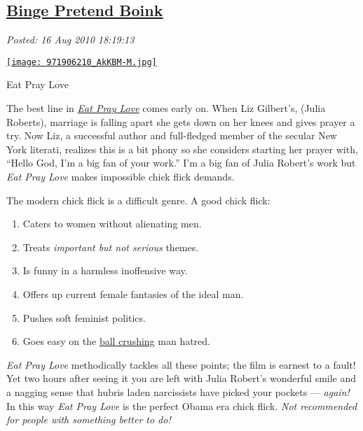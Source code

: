 %

\subsection*{\href{http://bakerjd99.wordpress.com/2010/08/16/binge-pretend-boink/}{Binge Pretend Boink}}


\noindent\emph{Posted: 16 Aug 2010 18:19:13}
\vspace{6pt}


\captionsetup[floatingfigure]{labelformat=empty}
\begin{floatingfigure}[r]{0.27\textwidth}
\centering
\href{http://www.boston.com/ae/movies/articles/2010/08/13/eat\_pray\_love\_movie\_review\_\_\_\_eat\_pray\_love\_showtimes/}{\texttt{[image: 971906210\_AkKBM-M.jpg]}}
\caption{Eat Pray  Love}
\label{fig:754X0}
\end{floatingfigure}The best line
in \href{http://www.rottentomatoes.com/m/eat\_pray\_love/}{\emph{Eat
Pray Love}} comes early on. When Liz Gilbert's, (Julia Roberts),
marriage is falling apart she gets down on her knees and gives prayer a
try. Now Liz, a successful author and full-fledged member of the secular
New York literati, realizes this is a bit phony so she considers
starting her prayer with, ``Hello God, I'm a big fan of your work.'' I'm
a big fan of Julia Robert's work but \emph{Eat Pray Love} makes
impossible chick flick demands.

The modern chick flick is a difficult genre. A good chick flick:

\begin{enumerate}
\item
  Caters to women without alienating men.
\item
  Treats \emph{important but not serious} themes.
\item
  Is funny in a harmless inoffensive way.
\item
  Offers up current female fantasies of the ideal man.
\item
  Pushes soft feminist politics.
\item
  Goes easy on the
  \href{http://www.urbandictionary.com/define.php?term=ball\%20crush}{ball
  crushing} man hatred.
\end{enumerate}
\emph{Eat Pray Love} methodically tackles all these points; the film is
earnest to a fault! Yet two hours after seeing it you are left with
Julia Robert's wonderful smile and a nagging sense that hubris laden
narcissists have picked your pockets --- \emph{again!} In this way
\emph{Eat Pray Love} is the perfect Obama era chick flick. \emph{Not
recommended for people with something better to do!}




%